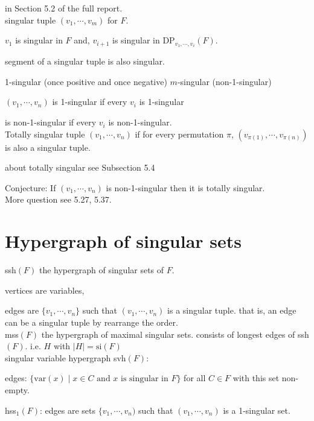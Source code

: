 \documentclass[12pt]{article}
\begin{document}
in Section 5.2 of the full report.\\


singular tuple $(v_1,\cdots, v_m)$ for $F$.

$v_1$ is singular in $F$ and, $v_{i+1}$ is singular in DP$_{v_1,\cdots,v_i}(F)$.

segment of a singular tuple is also singular.

1-singular (once positive and once negative)  $m$-singular (non-1-singular)

$(v_1,\cdots, v_n)$ is 1-singular if every $v_i$ is 1-singular

is non-1-singular if every $v_i$ is non-1-singular.\\


Totally singular tuple $(v_1,\cdots, v_n)$ if for every permutation $\pi$, $(v_{\pi(1)},\cdots, v_{\pi(n)})$ is also a singular tuple.

about totally singular see Subsection 5.4

Conjecture: If $(v_1,\cdots, v_n)$ is non-1-singular then it is totally singular.\\

More question see 5.27, 5.37.

\section{Hypergraph of singular sets}




ssh$(F)$ the hypergraph of singular sets of $F$.


vertices are variables,

edges are $\{v_1,\cdots,v_n\}$ such that $(v_1,\cdots, v_n)$ is a singular tuple. that is, an edge can be a singular tuple by rearrange the order.
\\

mss$(F)$ the hypergraph of maximal singular sets.
consists of longest edges of ssh$(F)$. i.e. $H$ with $|H|=\mbox{si}(F)$\\


singular variable hypergraph svh$(F)$:

edges: $\{\mbox{var}(x)\mid x\in C \mbox{ and }x \mbox{ is singular in }F\}$ for all $C\in F$ with this set non-empty.


hss$_1(F)$: edges are sets $\{v_1, \cdots, v_n)$ such that $(v_1,\cdots, v_n)$ is a 1-singular set.
\\
\end{document}
